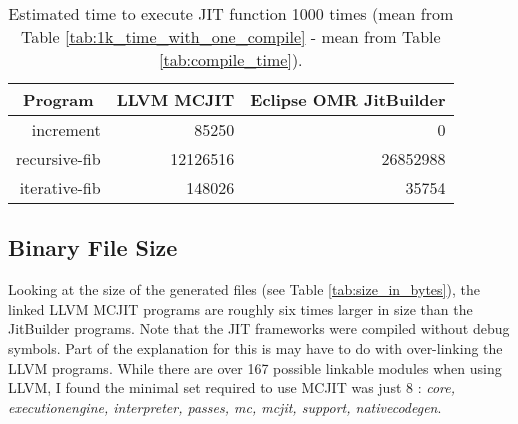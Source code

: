 \begin{table*}[t]
  \begin{tabular}{|r|l|l|} 
  \hline
  \multicolumn{1}{|c|}{\textbf{Program}}
  & \multicolumn{1}{c|}{\textbf{LLVM MCJIT}}                      
  & \multicolumn{1}{c|}{\textbf{Eclipse OMR JitBuilder}}
  \\ \hline

  increment                               
  & \multicolumn{1}{r|}{\num{85250}} %
  & \multicolumn{1}{r|}{\num{0}}     %
  \\ \hline
  
  recursive-fib                           
  & \multicolumn{1}{r|}{\num{12126516}} %
  & \multicolumn{1}{r|}{\num{26852988}} %
  \\ \hline
  
  iterative-fib                           
  & \multicolumn{1}{r|}{\num{148026}} %
  & \multicolumn{1}{r|}{\num{35754}} %
  \\ \hline
  
\end{tabular}
  \caption{Estimated time to execute JIT function 1000 times (mean from Table \ref{tab:1k_time_with_one_compile} - mean from Table \ref{tab:compile_time}).}
  \label{tab:1k_executions}
\end{table*}


\subsection{Binary File Size}
Looking at the size of the generated files (see Table \ref{tab:size_in_bytes}), the linked LLVM MCJIT programs are roughly six times larger in size than the JitBuilder programs.
Note that the JIT frameworks were compiled without debug symbols.
Part of the explanation for this is may have to do with over-linking the LLVM programs.
While there are over 167 possible linkable modules when using LLVM, I found the minimal set required to use MCJIT was just 8 : \textit{core, executionengine, interpreter, passes, mc, mcjit, support, nativecodegen}.

